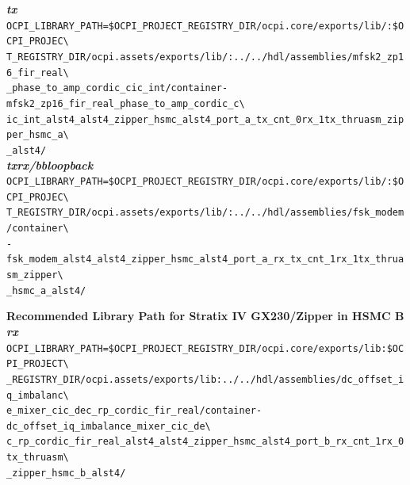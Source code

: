 \noindent\textbf{\textit{tx}}\\
\verb|OCPI_LIBRARY_PATH=$OCPI_PROJECT_REGISTRY_DIR/ocpi.core/exports/lib/:$OCPI_PROJEC\| \\
\verb|T_REGISTRY_DIR/ocpi.assets/exports/lib/:../../hdl/assemblies/mfsk2_zp16_fir_real\| \\
\verb|_phase_to_amp_cordic_cic_int/container-mfsk2_zp16_fir_real_phase_to_amp_cordic_c\| \\
\verb|ic_int_alst4_alst4_zipper_hsmc_alst4_port_a_tx_cnt_0rx_1tx_thruasm_zipper_hsmc_a\| \\
\verb|_alst4/| \\

\noindent\textbf{\textit{txrx/bbloopback}}\\
\verb|OCPI_LIBRARY_PATH=$OCPI_PROJECT_REGISTRY_DIR/ocpi.core/exports/lib/:$OCPI_PROJEC\| \\
\verb|T_REGISTRY_DIR/ocpi.assets/exports/lib/:../../hdl/assemblies/fsk_modem/container\| \\
\verb|-fsk_modem_alst4_alst4_zipper_hsmc_alst4_port_a_rx_tx_cnt_1rx_1tx_thruasm_zipper\| \\
\verb|_hsmc_a_alst4/| \\
\par\medskip

\noindent\textbf{Recommended Library Path for Stratix IV GX230/Zipper in HSMC B}\\

\noindent\textbf{\textit{rx}}\\
\verb|OCPI_LIBRARY_PATH=$OCPI_PROJECT_REGISTRY_DIR/ocpi.core/exports/lib:$OCPI_PROJECT\| \\
\verb|_REGISTRY_DIR/ocpi.assets/exports/lib:../../hdl/assemblies/dc_offset_iq_imbalanc\| \\
\verb|e_mixer_cic_dec_rp_cordic_fir_real/container-dc_offset_iq_imbalance_mixer_cic_de\| \\
\verb|c_rp_cordic_fir_real_alst4_alst4_zipper_hsmc_alst4_port_b_rx_cnt_1rx_0tx_thruasm\| \\
\verb|_zipper_hsmc_b_alst4/| \\

